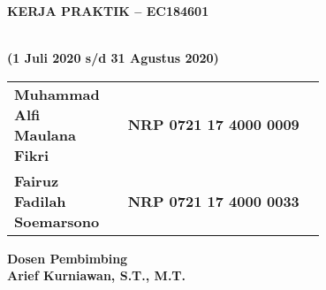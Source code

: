 
\thispagestyle{empty}


\begin{flushleft}

  \sffamily\color{white}

  \noindent\textbf{KERJA PRAKTIK – EC184601}
  \vspace{4ex}

   \\
  \textbf{(1 Juli 2020 s/d 31 Agustus 2020)}
  \vspace{6ex}

  \vspace{6ex}

  \begin{adjustwidth}{-0.2cm}{}
    \begin{tabular}{lcp{0.7\linewidth}}
      \textbf{Muhammad Alfi Maulana Fikri} & & \textbf{NRP 0721 17 4000 0009} \\
      \textbf{Fairuz Fadilah Soemarsono} & & \textbf{NRP 0721 17 4000 0033} \\
    \end{tabular}
  \end{adjustwidth}
  \vspace{4ex}

  \noindent\textbf{Dosen Pembimbing} \\
  \textbf{Arief Kurniawan, S.T., M.T.}
  \vspace{12ex}


\end{flushleft}
